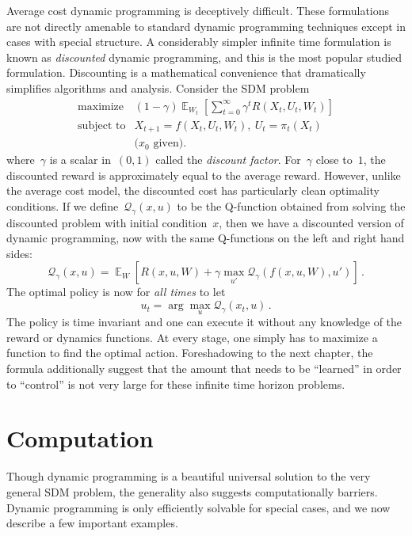 \documentclass{tufte-book}
\begin{document}
Average cost dynamic programming is deceptively difficult. These
formulations are not directly amenable to standard dynamic programming
techniques except in cases with special structure. A considerably
simpler infinite time formulation is known as \emph{discounted} dynamic
programming, and this is the most popular studied formulation.
Discounting is a mathematical convenience that dramatically simplifies
algorithms and analysis. Consider the SDM problem \[
    \begin{array}{ll}
        \text{maximize} &  (1-\gamma) \mathop\mathbb{E}_{W_t}[ \sum_{t=0}^\infty \gamma^t R(X_t,U_t,W_t) ]\\
        \text{subject to} & X_{t+1} = f(X_t, U_t, W_t),~U_t=\pi_t(X_t)\\
        & \text{($x_0$ given).}
    \end{array}
\] where~\(\gamma\) is a scalar in~\((0,1)\) called the \emph{discount
factor}. For~\(\gamma\) close to~\(1\), the
discounted reward is approximately equal to the average reward. However,
unlike the average cost model, the discounted cost has particularly
clean optimality conditions. If we define~\(\mathcal{Q}_\gamma(x,u)\) to
be the Q-function obtained from solving the discounted problem with
initial condition~\(x\), then we have a discounted version of dynamic
programming, now with the same Q-functions on the left and right hand
sides: \[
    \mathcal{Q}_\gamma(x,u) = \mathop\mathbb{E}_{W} \left[ R(x,u,W) + \gamma  \max_{u'} \mathcal{Q}_\gamma(f(x,u,W),u')\right]\,.
\] The optimal policy is now for \emph{all times} to let \[
    u_t= \arg\max_u \mathcal{Q}_\gamma(x_t,u)\,.
\] The policy is time invariant and one can execute it without any
knowledge of the reward or dynamics functions. At every stage, one
simply has to maximize a function to find the optimal action.
Foreshadowing to the next chapter, the formula additionally suggest that
the amount that needs to be ``learned'' in order to ``control'' is not
very large for these infinite time horizon problems.

\hypertarget{computation}{%
\section{Computation}\label{computation}}

Though dynamic programming is a beautiful universal solution to the very
general SDM problem, the generality also suggests computationally
barriers. Dynamic programming is only efficiently solvable for special
cases, and we now describe a few important examples.
\end{document}
